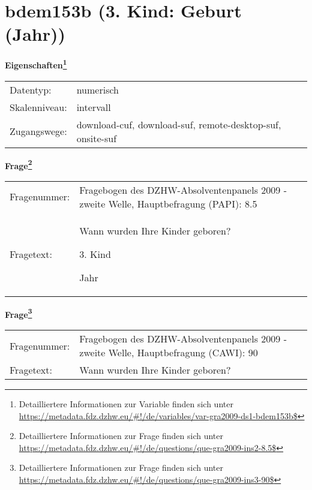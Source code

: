 
    \setcounter{footnote}{0}

    \vspace*{-1.8cm}
	\section{bdem153b (3. Kind: Geburt (Jahr))}
	\label{section:bdem153b}



    \vspace*{0.5cm}
    \noindent\textbf{Eigenschaften\footnote{Detailliertere Informationen zur Variable finden sich unter
		\url{https://metadata.fdz.dzhw.eu/\#!/de/variables/var-gra2009-ds1-bdem153b$}}}\\
	\begin{tabularx}{\hsize}{@{}lX}
	Datentyp: & numerisch \\
	Skalenniveau: & intervall \\
	Zugangswege: &
	  download-cuf, 
	  download-suf, 
	  remote-desktop-suf, 
	  onsite-suf
 \\
    \end{tabularx}



				\vspace*{0.5cm}
                \noindent\textbf{Frage\footnote{Detailliertere Informationen zur Frage finden sich unter
		              \url{https://metadata.fdz.dzhw.eu/\#!/de/questions/que-gra2009-ins2-8.5$}}}\\
				\begin{tabularx}{\hsize}{@{}lX}
					Fragenummer: &
					  Fragebogen des DZHW-Absolventenpanels 2009 - zweite Welle, Hauptbefragung (PAPI):
					  8.5
 \\
					Fragetext: & Wann wurden Ihre Kinder geboren?\par  3. Kind\par  Jahr \\
				\end{tabularx}
				\vspace*{0.5cm}
                \noindent\textbf{Frage\footnote{Detailliertere Informationen zur Frage finden sich unter
		              \url{https://metadata.fdz.dzhw.eu/\#!/de/questions/que-gra2009-ins3-90$}}}\\
				\begin{tabularx}{\hsize}{@{}lX}
					Fragenummer: &
					  Fragebogen des DZHW-Absolventenpanels 2009 - zweite Welle, Hauptbefragung (CAWI):
					  90
 \\
					Fragetext: & Wann wurden Ihre Kinder geboren? \\
				\end{tabularx}





